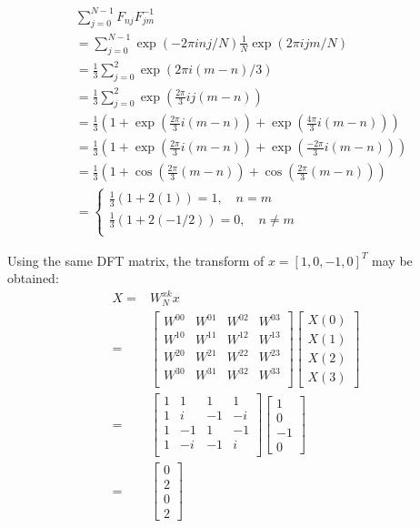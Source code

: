\message{ !name(Assn2.tex)}\documentclass[twocolumn]{article}
\begin{document}
\begin{equation}
\begin{split}
&\sum_{j=0}^{N-1} F_{nj} F_{jm}^{-1} \\ &= \sum_{j=0}^{N-1} \exp(-2\pi i nj/N) \frac{1}{N} \exp(2\pi ijm/N) \\
&= \frac{1}{3} \sum_{j=0}^{2} \exp(2\pi i(m-n)/3)  \\
&= \frac{1}{3} \sum_{j=0}^{2} \exp(\frac{2\pi}{3} ij(m-n))  \\
&= \frac{1}{3} (1 + \exp(\frac{2\pi}{3} i(m-n)) + \exp(\frac{4\pi}{3} i(m-n))  )\\
&= \frac{1}{3} (1 + \exp(\frac{2\pi}{3} i(m-n)) + \exp(\frac{-2\pi}{3} i(m-n))  )\\
&= \frac{1}{3} (1 + \cos(\frac{2\pi}{3}(m-n)) + \cos(\frac{2\pi}{3} (m-n))  )\\
&=\begin{cases}
\frac{1}{3} (1 + 2(1)) = 1, \quad n=m \\
\frac{1}{3} (1 + 2(-1/2)) =0, \quad n\neq m\\
\end{cases}
\end{split}
\end{equation}

Using the same DFT matrix, the transform of $x=[1,0,-1,0]^T$ may be obtained:
\begin{equation}
\begin{split}
X =& W^{xk}_N x \\
=&\begin{bmatrix}
W^{00} & W^{01} & W^{02} & W^{03} \\
W^{10} & W^{11} & W^{12} & W^{13} \\
W^{20} & W^{21} & W^{22} & W^{23} \\
W^{30} & W^{31} & W^{32} & W^{33} \\
\end{bmatrix} \begin{bmatrix}X(0) \\ X(1) \\ X(2) \\ X(3)\end{bmatrix} \\
=& \begin{bmatrix}
1 & 1 & 1 & 1 \\
1 & i & -1 & -i \\
1 & -1 & 1 & -1 \\
1 & -i & -1 & i \\
\end{bmatrix} \begin{bmatrix}1 \\ 0 \\ -1 \\ 0\end{bmatrix} \\
=& \begin{bmatrix}0 \\ 2 \\ 0 \\ 2\end{bmatrix} \\
\end{split}
\end{equation}
\end{document}
